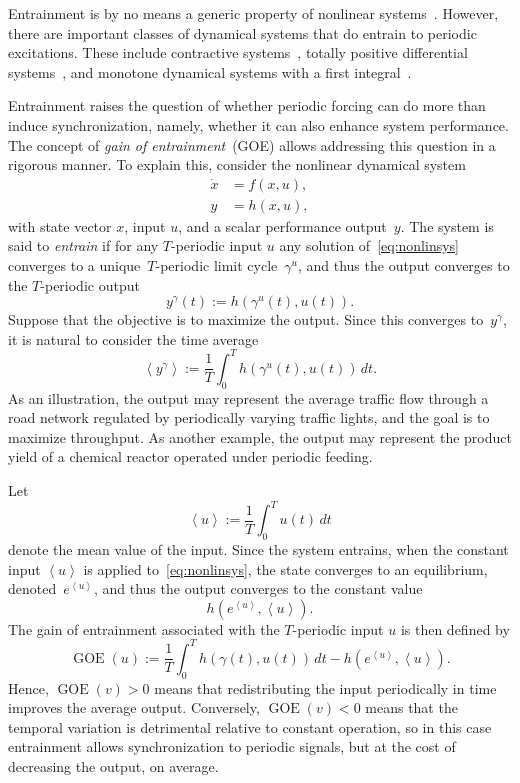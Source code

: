 \documentclass[onecolumn]{IEEEtran}
\newcommand{\GOE}{\operatorname{GOE}}
\newcommand{\avg}[1]{\left\langle #1\right\rangle}
\begin{document}
Entrainment is by no means a generic property of nonlinear systems~\cite{NIKOLAEV20181232,takac_sub_harmonics}.
However, there are important classes   of dynamical systems that do  entrain to periodic excitations. These include contractive systems~\cite{AminzareSontag2014,Russo2010}, totally positive differential systems~\cite{TPDS_MAR_SONATG},
and monotone dynamical systems with a first integral~\cite{Ji-Fa-periodic}. 
 

Entrainment raises the question of whether periodic forcing can do more than
induce synchronization, namely, whether it can also enhance system performance.
The concept of \emph{gain of entrainment}~(GOE) allows  addressing  this question in a rigorous manner. To explain this, consider the nonlinear dynamical system 
\begin{align} \label{eq:nonlinsys}
\dot x&=f(x,u), \nonumber \\
y&=h(x,u),
\end{align}
with state
vector \(x\), input \(u\), and a scalar performance output~$y$.
The system is said to \emph{entrain} if for any \(T\)-periodic input \(u\)  any solution of~\eqref{eq:nonlinsys} converges to a unique~$T$-periodic limit cycle~$\gamma^u$, and thus the output converges to  the $T$-periodic output
\[
y^\gamma(t):=h(\gamma^u(t),u(t)).
\]
Suppose that the objective is to maximize the output. Since this converges to~$y^\gamma$, it is natural to consider the time average
\[
\avg{y^\gamma} := \frac{1}{T}\int_0^T h(\gamma^u(t),u(t))\,dt.
\]
As an illustration, the output may represent the average traffic flow through a
road network regulated by periodically varying traffic lights, and the goal is   
to maximize throughput. As another example, the output may represent the product yield of a chemical reactor operated under   periodic     feeding.


Let
\[
\avg{u}:=\frac1T\int_0^T u(t)\,dt
\]
denote the mean value of the input.
Since the system entrains, when  the constant input \(\avg{u}\) is applied to~\eqref{eq:nonlinsys}, the state converges to an
equilibrium,  denoted~\(e^{\avg{u}}\), and  thus the output converges to  the constant value
\[
h(e^{\avg{u}},\avg{u}).
\]
The gain of entrainment associated with the $T$-periodic input \(u\) is then defined
by
\[
\GOE(u):=
\frac1T\int_0^T h(\gamma(t),u(t))\,dt
-h(e^{\avg{u}},\avg{u}).
\]
Hence, \(\GOE(v)>0\) means that redistributing the input periodically in time
improves the average output. Conversely,
\(\GOE(v)<0\) means that the temporal variation is detrimental relative to
constant operation, so in this  case entrainment allows 
synchronization to periodic signals, but at the cost of decreasing  the output, on average.
\end{document}
